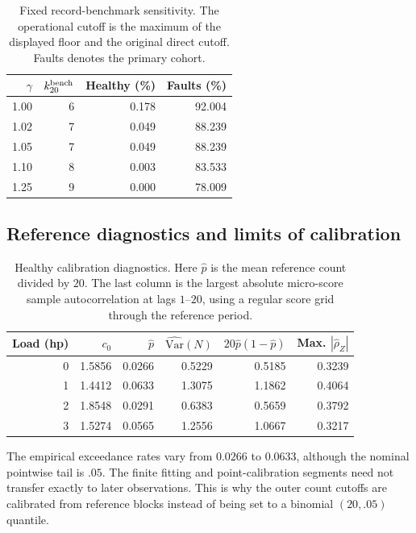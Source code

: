 \documentclass[11pt]{article}
\theoremstyle{definition}
\theoremstyle{remark}
\newcommand{\1}{\mathbf 1}
\begin{document}
\begin{table}[H]
\centering\small
\begin{tabular}{rrrr}
\toprule
$\gamma$ & $k^{\rm bench}_{20}$ & Healthy (\%) & Faults (\%) \\
\midrule
1.00 & 6 & 0.178 & 92.004 \\
1.02 & 7 & 0.049 & 88.239 \\
1.05 & 7 & 0.049 & 88.239 \\
1.10 & 8 & 0.003 & 83.533 \\
1.25 & 9 & 0.000 & 78.009 \\
\bottomrule
\end{tabular}
\caption{Fixed record-benchmark sensitivity. The operational cutoff is the maximum of the displayed floor and the original direct cutoff. Faults denotes the primary cohort.}
\label{tab:cwru_gamma}
\end{table}

\clearpage
\subsection{Reference diagnostics and limits of calibration}\hypertarget{app:cwru:diagnostics}{}

\begin{table}[H]
\centering\small
\setlength{\tabcolsep}{5pt}
\begin{tabular}{rrrrrr}
\toprule
Load (hp) & $c_0$ & $\widehat p$ & $\widehat{\mathrm{Var}}(N)$ & $20\widehat p(1-\widehat p)$ & Max. $|\widehat\rho_Z|$ \\
\midrule
0 & 1.5856 & 0.0266 & 0.5229 & 0.5185 & 0.3239 \\
1 & 1.4412 & 0.0633 & 1.3075 & 1.1862 & 0.4064 \\
2 & 1.8548 & 0.0291 & 0.6383 & 0.5659 & 0.3792 \\
3 & 1.5274 & 0.0565 & 1.2556 & 1.0667 & 0.3217 \\
\bottomrule
\end{tabular}
\caption{Healthy calibration diagnostics. Here \(\widehat p\) is the mean reference count divided by \(20\). The last column is the largest absolute micro-score sample autocorrelation at lags \(1\)--\(20\), using a regular score grid through the reference period.}
\end{table}

The empirical exceedance rates vary from \(0.0266\) to \(0.0633\), although the nominal pointwise tail is \(.05\). The finite fitting and point-calibration segments need not transfer exactly to later observations. This is why the outer count cutoffs are calibrated from reference blocks instead of being set to a binomial \((20,.05)\) quantile.
\end{document}
